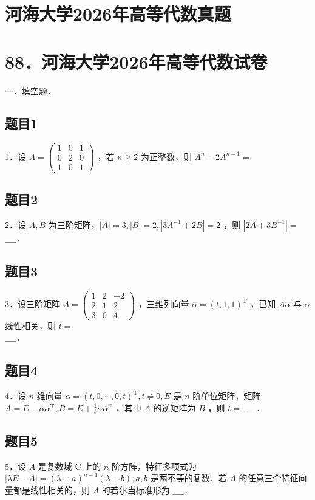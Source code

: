 \documentclass{article}
\begin{document}
\section*{河海大学2026年高等代数真题}
\section*{88．河海大学2026年高等代数试卷}
一．填空题．\\

\subsection{题目1}
1．设 \(A=\left(\begin{array}{lll}1 & 0 & 1 \\ 0 & 2 & 0 \\ 1 & 0 & 1\end{array}\right)\) ，若 \(n \geq 2\) 为正整数，则 \(A^{n}-2 A^{n-1}=\)

\subsection{题目2}
2．设 \(A, B\) 为三阶矩阵，\(|A|=3,|B|=2,\left|3 A^{-1}+2 B\right|=2\) ，则 \(\left|2 A+3 B^{-1}\right|=\) \(\_\_\_\_\)．

\subsection{题目3}
3．设三阶矩阵 \(A=\left(\begin{array}{lll}1 & 2 & -2 \\ 2 & 1 & 2 \\ 3 & 0 & 4\end{array}\right)\) ，三维列向量 \(\alpha=(t, 1,1)^{\mathrm{T}}\) ，已知 \(A \alpha\) 与 \(\alpha\) 线性相关，则 \(t=\)\\
\(\_\_\_\_\)．

\subsection{题目4}
4．设 \(n\) 维向量 \(\alpha=(t, 0, \cdots, 0, t)^{\mathrm{T}}, t \neq 0, E\) 是 \(n\) 阶单位矩阵，矩阵 \(A=E-\alpha \alpha^{\mathrm{T}}, B=E+\frac{1}{t} \alpha \alpha^{\mathrm{T}}\) ，其中 \(A\) 的逆矩阵为 \(B\) ，则 \(t=\) \(\_\_\_\_\)．

\subsection{题目5}
5．设 \(A\) 是复数域 C 上的 \(n\) 阶方阵，特征多项式为 \(|\lambda E-A|=(\lambda-a)^{n-1}(\lambda-b), a, b\) 是两不等的复数．若 \(A\) 的任意三个特征向量都是线性相关的，则 \(A\) 的若尔当标准形为 \(\_\_\_\_\)．
\end{document}
